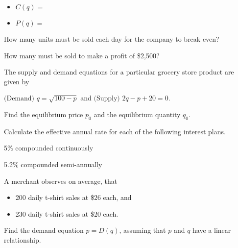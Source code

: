 \documentclass[12pt,legalpaper]{exam}
\newcommand{\vsp}{\vspace{0.5cm}}
\newcommand{\smsp}{\vspace{0.25cm}}
\begin{document}
\begin{questions}
\begin{compactenum}[(a)]
\begin{itemize}
\item[] $C(q) =$
\vspace{1.5cm}

\item[] $P(q) =$
\end{itemize}
\vspace{1.5cm}

\smsp

\item How many units must be sold each day for the company to break even?
\vspace{5cm}

\item How many must be sold to make a profit of \$2,500?
\end{compactenum}
\vspace{5cm}
\newpage

\question[4] The supply and demand equations for a particular grocery store product are given by
\begin{center}
$\text{(Demand) }q = \sqrt{100 - p}$ and $\text{(Supply) }2q - p + 20 = 0$.
\end{center}
Find the equilibrium price $p_{0}$ and the equilibrium quantity $q_{0}$.
\vspace{15cm}

\question[3] Calculate the effective annual rate for each of the following interest plans.
\begin{compactenum}[(a)]
\item 5\% compounded continuously
\vspace{5cm}

\item 5.2\% compounded semi-annually
\vspace{5cm}
\end{compactenum}
\newpage

\question[5] A merchant observes on average, that
\begin{itemize}
\item 200 daily t-shirt sales at \$26 each, and
\smsp

\item 230 daily t-shirt sales at \$20 each.
\end{itemize}
\vsp

\begin{compactenum}[(a)]
\item Find the demand equation $p = D(q)$, assuming that $p$ and $q$ have a linear relationship.
\vspace{5cm}


\end{compactenum}
\end{questions}
\end{document}
